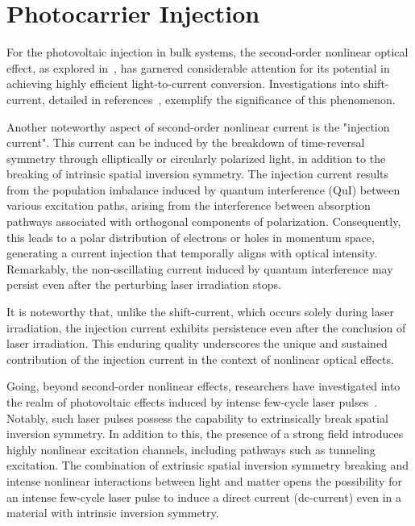 \section{Photocarrier Injection}
For the photovoltaic injection in bulk systems, the second-order nonlinear optical effect, as explored in~\cite{PhysRevB.61.5337}, has garnered considerable attention for its potential in achieving highly efficient light-to-current conversion. Investigations into shift-current, detailed in references~\cite{PhysRevLett.107.126805,doi:10.1126/science.1168636,Yang2010,10.1063/5.0101513}, exemplify the significance of this phenomenon.

Another noteworthy aspect of second-order nonlinear current is the "injection
current"\cite{sipe2000second,laman2005ultrafast,
	10.1063/1.125084,PhysRevB.61.5337,10.1063/1.2131191}. This current can be induced by the
breakdown of time-reversal symmetry through elliptically or circularly polarized light, in addition to the
breaking of intrinsic spatial inversion symmetry. The injection current results from the population
imbalance induced by quantum interference (\gls{QuI}) between various excitation paths, arising
from the interference between absorption pathways associated with orthogonal components of
polarization. Consequently, this leads to a polar distribution of electrons or holes in momentum
space, generating a current injection that temporally aligns with optical intensity. Remarkably,
the non-oscillating current induced by quantum interference may persist even after the perturbing
laser irradiation stops.

It is noteworthy that, unlike the shift-current, which occurs solely during laser irradiation, the injection current exhibits persistence even after the conclusion of laser irradiation. This enduring quality underscores the unique and sustained contribution of the injection current in the context of nonlinear optical effects.

Going, beyond second-order nonlinear effects, researchers have investigated into the realm of
photovoltaic effects induced by intense few-cycle laser
pulses~\cite{Schiffrin2013,PhysRevLett.113.087401,PhysRevLett.116.057401,Higuchi2017,Heide_2020,Morimoto_2022}.
Notably, such laser pulses possess the capability to extrinsically break spatial inversion
symmetry. In addition to this, the presence of a strong field introduces highly nonlinear
excitation channels, including pathways such as tunneling excitation. The combination of extrinsic spatial inversion symmetry breaking and intense nonlinear interactions between light and matter opens the possibility for an intense few-cycle laser pulse to induce a direct current (dc-current) even in a material with intrinsic inversion symmetry.


